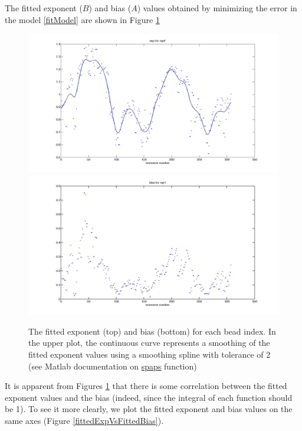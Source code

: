 \documentclass[12pt]{book}
\begin{document}
The fitted exponent ($B$) and bias ($A$) values obtained by minimizing the error in the model \ref{fitModel} are shown in Figure \ref{fittedExpAndBias}
\begin{figure}[H]
\includegraphics[scale=0.15]{fittedExpValuesWithSplineRep1}
\includegraphics[scale=0.15]{fittedBiasValuesRep1}
\caption{\scriptsize{The fitted exponent (top) and bias (bottom) for each bead index. In the upper plot, the continuous curve represents a smoothing of the fitted exponent values using a smoothing spline with tolerance of 2 (see Matlab documentation on \href{http://www.mathworks.fr/fr/help/curvefit/spaps.html}{spaps} function)}}
\label{fittedExpAndBias}
\end{figure}

It is apparent from Figures \ref{fittedExpAndBias} that there is some correlation between the fitted exponent values and the bias (indeed, since the integral of each function should be 1). To see it more clearly, we plot the fitted exponent and bias values on the same axes (Figure \ref{fittedExpVsFittedBias}). 
\end{document}
